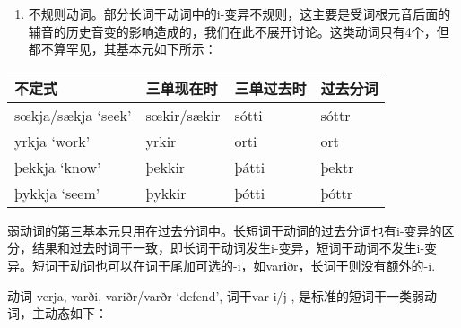 \begin{enumerate}
  \def\labelenumi{\arabic{enumi})}
  \setcounter{enumi}{2}
  \item
        不规则动词。部分长词干动词中的i-变异不规则，这主要是受词根元音后面的辅音的历史音变的影响造成的，我们在此不展开讨论。这类动词只有4个，但都不算罕见，其基本元如下所示：
\end{enumerate}

\begin{longtable}{llll}
  \toprule
  不定式                & 三单现在时       & 三单过去时 & 过去分词  \\
  \midrule
  \endhead
  \bottomrule
  \endfoot
  sœkja/sækja `seek' & sœkir/sækir & sótti & sóttr \\
  yrkja `work'       & yrkir       & orti  & ort   \\
  þekkja `know'      & þekkir      & þátti & þektr \\
  þykkja `seem'      & þykkir      & þótti & þóttr \\
\end{longtable}

弱动词的第三基本元只用在过去分词中。长短词干动词的过去分词也有i-变异的区分，结果和过去时词干一致，即长词干动词发生i-变异，短词干动词不发生i-变异。短词干动词也可以在词干尾加可选的-i，如var\textbf{i}ðr，长词干则没有额外的-i.

动词 verja, varði, variðr/varðr `defend‌', 词干var-i/j-,
是标准的短词干一类弱动词，主动态如下：

